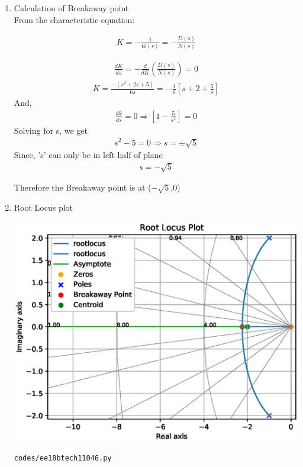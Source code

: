 \begin{enumerate}[label=\thesection.\arabic*.,ref=\thesection.\theenumi]
\item Calculation of Breakaway point \\

From the characteristic equation:
    
    \begin{align}
        K=-\frac{1}{G(s)}=-\frac{D(s)}{N(s)}    
    \end{align}

    \begin{align}
        \frac{d K}{d s}=-\frac{d}{d K}\left(\frac{D(s)}{N(s)}\right)=0    
    \end{align}
    \begin{align}
        K=\frac{-\left(s^{2}+2 s+5\right)}{6 s}=-\frac{1}{6}\left[s+2+\frac{5}{s}\right]    
    \end{align}
    And,
    \begin{align}
        \frac{d k}{d s}=0 \Rightarrow\left[1-\frac{5}{s^{2}}\right]=0 
    \end{align}
    Solving for s, we get
    \begin{align}
        s^{2}-5=0 \Rightarrow s=\pm \sqrt{5}    
    \end{align}
    Since, 's' can only be in left half of plane
    \begin{align}
        \boxed{s=-\sqrt{5}}    
    \end{align}
    
    Therefore the Breakaway point is at ($-\sqrt{5}$,0)

    
\item Root Locus plot

	\includegraphics[width=\columnwidth]{./figs/ee18btech11046.eps}

\begin{lstlisting}
codes/ee18btech11046.py
\end{lstlisting}    

\end{enumerate}


